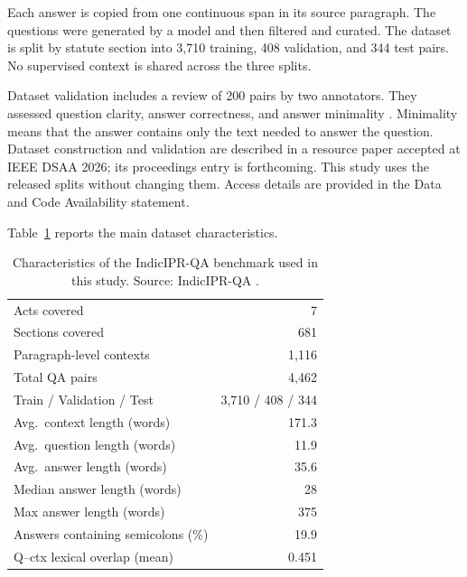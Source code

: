 \documentclass[pdflatex,sn-basic]{sn-jnl}%
\theoremstyle{thmstyleone}%
\theoremstyle{thmstyletwo}%
\theoremstyle{thmstylethree}%
\begin{document}
Each answer is copied from one continuous span in its source paragraph. The
questions were generated by a model and then filtered and curated. The dataset
is split by statute section into 3,710 training, 408 validation, and 344 test
pairs. No supervised context is shared across the three splits.

Dataset validation includes a review of 200 pairs by two annotators. They
assessed question clarity, answer correctness, and answer minimality
\citep{anonymous2026indiciprqa}. Minimality means that the answer contains only
the text needed to answer the question. Dataset construction and validation
are described in a resource paper accepted at IEEE DSAA 2026; its proceedings
entry is forthcoming. This study uses the released splits without changing
them. Access details are provided in the Data and Code Availability statement.

Table~\ref{tab:indicipriqa_stats} reports the main dataset characteristics.

\begin{table}[!htbp]
    \caption{Characteristics of the IndicIPR-QA benchmark used in this study.
    Source: IndicIPR-QA \citep{anonymous2026indiciprqa}.}
    \label{tab:indicipriqa_stats}
    \centering
    \scriptsize
    \begin{tabular}{lr}
        \toprule
        Acts covered                       & 7 \\
        Sections covered                   & 681 \\
        Paragraph-level contexts           & 1,116 \\
        Total QA pairs                     & 4,462 \\
        Train / Validation / Test          & 3,710 / 408 / 344 \\
        Avg.\ context length (words)       & 171.3 \\
        Avg.\ question length (words)      & 11.9 \\
        Avg.\ answer length (words)        & 35.6 \\
        Median answer length (words)       & 28 \\
        Max answer length (words)          & 375 \\
        Answers containing semicolons (\%) & 19.9 \\
        Q--ctx lexical overlap (mean)      & 0.451 \\
        \bottomrule
    \end{tabular}
\end{table}
\end{document}
